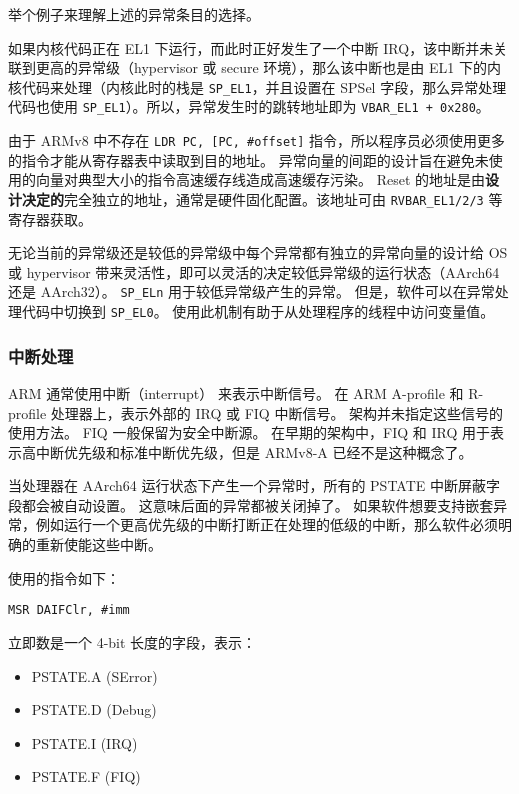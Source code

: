 举个例子来理解上述的异常条目的选择。

如果内核代码正在 EL1 下运行，而此时正好发生了一个中断 IRQ，该中断并未关联到更高的异常级（hypervisor 或 secure 环境），那么该中断也是由 EL1 下的内核代码来处理（内核此时的栈是 \lstinline!SP_EL1!，并且设置在 SPSel 字段，那么异常处理代码也使用 \lstinline!SP_EL1!）。所以，异常发生时的跳转地址即为 \lstinline!VBAR_EL1 + 0x280!。

由于 ARMv8 中不存在 \lstinline!LDR PC, [PC, #offset]! 指令，所以程序员必须使用更多的指令才能从寄存器表中读取到目的地址。
异常向量的间距的设计旨在避免未使用的向量对典型大小的指令高速缓存线造成高速缓存污染。
Reset 的地址是由\textbf{设计决定的}完全独立的地址，通常是硬件固化配置。该地址可由 \lstinline!RVBAR_EL1/2/3! 等寄存器获取。

无论当前的异常级还是较低的异常级中每个异常都有独立的异常向量的设计给 OS 或 hypervisor 带来灵活性，即可以灵活的决定较低异常级的运行状态（AArch64 还是 AArch32）。
\lstinline!SP_ELn! 用于较低异常级产生的异常。
但是，软件可以在异常处理代码中切换到 \lstinline!SP_EL0!。
使用此机制有助于从处理程序的线程中访问变量值。

\subsubsection{中断处理}

ARM 通常使用中断（interrupt） 来表示中断信号。
在 ARM A-profile 和 R-profile 处理器上，表示外部的 IRQ 或 FIQ 中断信号。
架构并未指定这些信号的使用方法。
FIQ 一般保留为安全中断源。
在早期的架构中，FIQ 和 IRQ 用于表示高中断优先级和标准中断优先级，但是 ARMv8-A 已经不是这种概念了。

当处理器在 AArch64 运行状态下产生一个异常时，所有的 PSTATE 中断屏蔽字段都会被自动设置。
这意味后面的异常都被关闭掉了。
如果软件想要支持嵌套异常，例如运行一个更高优先级的中断打断正在处理的低级的中断，那么软件必须明确的重新使能这些中断。

使用的指令如下：

{
  \lstinline!MSR DAIFClr, #imm!
}

立即数是一个 4-bit 长度的字段，表示：

\begin{itemize}
  \item PSTATE.A (SError)
  \item PSTATE.D (Debug)
  \item PSTATE.I (IRQ)
  \item PSTATE.F (FIQ)
\end{itemize}

